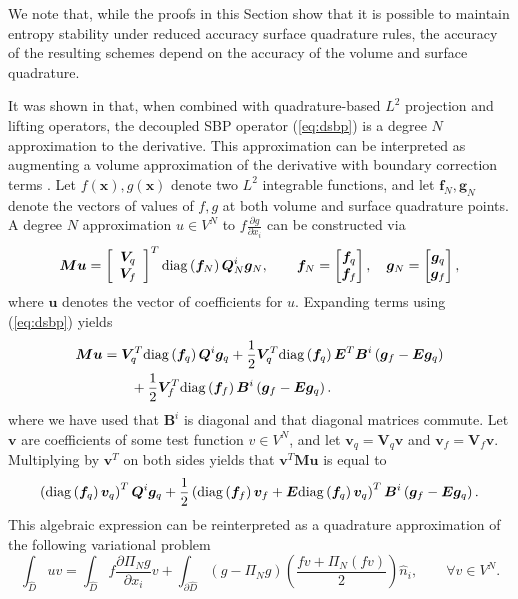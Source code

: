\documentclass[review]{siamart0216}
\theoremstyle{assumption}
\renewcommand{\hat}[1]{\hat{#1}}
\newcommand{\pd}[2]{\frac{\partial#1}{\partial#2}}
\newcommand{\LRp}[1]{\left( #1 \right)}
\newcommand{\LRs}[1]{\left[ #1 \right]}
\renewcommand{\hat}{\widehat}
\newcommand{\note}[1]{{\color{blue}{#1}}}
\newcommand{\diag}[1]{{\rm diag}\LRp{#1}}
\begin{document}
We note that, while the proofs in this Section show that it is possible to maintain entropy stability under reduced accuracy surface quadrature rules, the accuracy of the resulting schemes depend on the accuracy of the volume and surface quadrature.  %

It was shown in \cite{chan2017discretely} that, when combined with quadrature-based $L^2$ projection and lifting operators, the decoupled SBP operator (\ref{eq:dsbp}) is a degree $N$ approximation to the derivative.  This approximation can be interpreted as augmenting a volume approximation of the derivative with boundary correction terms \cite{chan2018efficient}.  Let $f(\bm{x}),g(\bm{x})$ denote two $L^2$ integrable functions, and let $\bm{f}_N, \bm{g}_N$ denote the vectors of values of $f,g$ at both volume and surface quadrature points.  A degree $N$ approximation $u\in V^N$ to $f\pd{g}{x_i}$ can be constructed via
\[
\bm{M}\bm{u} = \LRs{\begin{array}{c}
\bm{V}_q \\ \bm{V}_f\end{array}}^T \diag{\bm{f}_N}\bm{Q}^i_N\bm{g}_N, \qquad \bm{f}_N = \begin{bmatrix} \bm{f}_q\\ \bm{f}_f\end{bmatrix}, \quad \bm{g}_N = \begin{bmatrix} \bm{g}_q\\ \bm{g}_f\end{bmatrix},
\]
where $\bm{u}$ denotes the vector of coefficients for $u$.  Expanding terms using (\ref{eq:dsbp}) yields 
\begin{align*}
\bm{M}\bm{u} &= \bm{V}_q^T \diag{\bm{f}_q} \bm{Q}^i \bm{g}_q + \frac{1}{2}\bm{V}_q^T\diag{\bm{f}_q}\bm{E}^T\bm{B}^i \LRp{\bm{g}_f -\bm{E}\bm{g}_q}  \\
&\qquad + \frac{1}{2}\bm{V}_f^T\diag{\bm{f}_f}\bm{B}^i \LRp{\bm{g}_f -\bm{E}\bm{g}_q}.
\end{align*}
where we have used that $\bm{B}^i$ is diagonal and that diagonal matrices commute.  Let $\bm{v}$ are coefficients of some test function $v\in V^N$, and let $\bm{v}_q = \bm{V}_q\bm{v}$ and $\bm{v}_f = \bm{V}_f \bm{v}$.  Multiplying by $\bm{v}^T$ on both sides yields that $\bm{v}^T\bm{M}\bm{u}$ is equal to
\begin{align*}
\LRp{\diag{\bm{f}_q}\bm{v}_q}^T \bm{Q}^i \bm{g}_q + \frac{1}{2}\LRp{\diag{\bm{f}_f}\bm{v}_f+\bm{E}\diag{\bm{f}_q}\bm{v}_q}^T\bm{B}^i \LRp{\bm{g}_f -\bm{E}\bm{g}_q} .
\end{align*}
This algebraic expression can be reinterpreted as a quadrature approximation of the following variational problem
\begin{equation}
\int_{\hat{D}} u v = \int_{\hat{D}} f\pd{\Pi_N g}{x_i}v + \int_{\partial \hat{D}} \LRp{g - \Pi_Ng} \LRp{\frac{fv + \Pi_N(fv)}{2}} \hat{n}_i, \qquad \forall v\in V^N.
\label{eq:var}
\end{equation}
\end{document}
